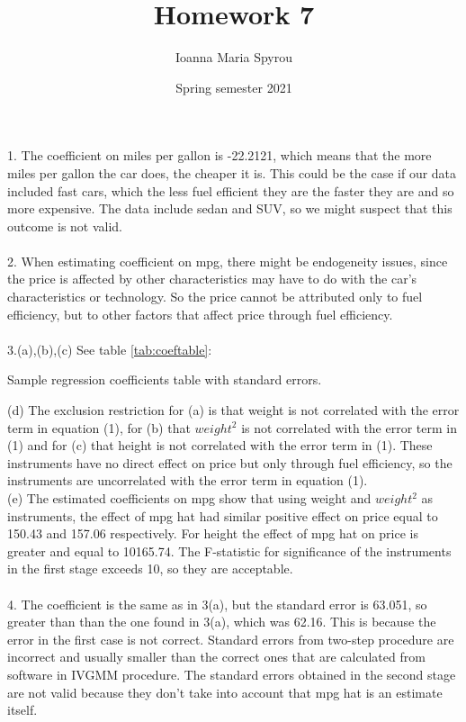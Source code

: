 \documentclass{article}
\title{Homework 7}
\author{Ioanna Maria Spyrou}
\date{Spring semester 2021}
\begin{document}
  
\maketitle


1. The coefficient on miles per gallon is -22.2121, which means that the more miles per gallon the car does, the cheaper it is. This could be the case if our data included fast cars, which the less fuel efficient they are the faster they are and so more expensive. The data include sedan and SUV, so we might suspect that this outcome is not valid.\\
\\
2. When estimating coefficient on mpg, there might be endogeneity issues, since the price is affected by other characteristics may have to do with the car's characteristics or technology. So the price cannot be attributed only to fuel efficiency, but to other factors that affect price through fuel efficiency.\\
\\
3.(a),(b),(c) See table \ref{tab:coeftable}:

\begin{table}[ht]
    \centering
    
    \caption{Sample regression coefficients table with standard errors.}
    \label{tab:coeftable}
\end{table}
(d) The exclusion restriction for (a) is that weight is not correlated with the error term in equation (1), for 
(b) that $weight^2$ is not correlated with the error term in (1) and for (c) that height is not correlated with the error term in (1). These instruments have no direct effect on price but only through fuel efficiency, so the instruments are uncorrelated with the error term in equation (1).
\\
(e) The estimated coefficients on mpg show that using weight and $weight^2$ as instruments, the effect of mpg hat had similar positive effect on price equal to 150.43 and 157.06 respectively. For height the effect of mpg hat on price is greater and equal to 10165.74. The F-statistic for significance of the instruments in the first stage exceeds 10, so they are acceptable.  \\
\\
4. The coefficient is the same as in 3(a), but the standard error is 63.051, so greater than than the one found in 3(a), which was 62.16. This is because the error in the first case is not correct. Standard errors from two-step procedure are incorrect and usually smaller than the correct ones that are calculated from software in IVGMM procedure. The standard errors obtained in the second stage are not valid because they don't take into account that mpg hat is an estimate itself.
\end{document}
